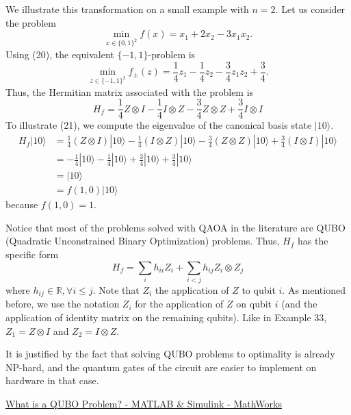 \begin{example}
    We illustrate this transformation on a small example with $n=2$. Let us consider the problem
\begin{equation}
    \min _{x \in\{0,1\}^{2}} f(x)=x_{1}+2 x_{2}-3 x_{1} x_{2}.
\end{equation}
Using (20), the equivalent $\{-1,1\}$-problem is
\begin{equation}
    \min _{z \in\{-1,1\}^{2}} f_{ \pm}(z)=\frac{1}{4} z_{1}-\frac{1}{4} z_{2}-\frac{3}{4} z_{1} z_{2}+\frac{3}{4}.
\end{equation}
Thus, the Hermitian matrix associated with the problem is
\begin{equation}
    H_{f}=\frac{1}{4} Z \otimes I-\frac{1}{4} I \otimes Z-\frac{3}{4} Z \otimes Z+\frac{3}{4} I \otimes I
\end{equation}
To illustrate (21), we compute the eigenvalue of the canonical basis state $|10\rangle$.
\begin{equation}
\begin{aligned}
H_{f}|10\rangle & =\frac{1}{4}(Z \otimes I)|10\rangle-\frac{1}{4}(I \otimes Z)|10\rangle-\frac{3}{4}(Z \otimes Z)|10\rangle+\frac{3}{4}(I \otimes I)|10\rangle \\
& =-\frac{1}{4}|10\rangle-\frac{1}{4}|10\rangle+\frac{3}{4}|10\rangle+\frac{3}{4}|10\rangle \\
& =|10\rangle \\
& =f(1,0)|10\rangle
\end{aligned}
\end{equation}
because $f(1,0)=1$.
\end{example}

Notice that most of the problems solved with QAOA in the literature are QUBO (Quadratic Unconstrained Binary Optimization) problems. Thus, $H_{f}$ has the specific form
\begin{equation}
    H_{f}=\sum_{i} h_{i i} Z_{i}+\sum_{i<j} h_{i j} Z_{i} \otimes Z_{j}
\end{equation}
where $h_{i j} \in \mathbb{R}, \forall i \leq j$. Note that $Z_{i}$ the application of $Z$ to qubit $i$. As mentioned before, we use the notation $Z_{i}$ for the application of $Z$ on qubit $i$ (and the application of identity matrix on the remaining qubits). Like in Example 33, $Z_1=Z \otimes I$ and $Z_2=I \otimes Z$.

\begin{remark}
    It is justified by the fact that solving QUBO problems to optimality is already NP-hard, and the quantum gates of the circuit are easier to implement on hardware in that case.

\href{https://ww2.mathworks.cn/help/matlab/math/what-is-a-qubo.html}{What is a QUBO Problem? - MATLAB \& Simulink - MathWorks} 
\end{remark}

